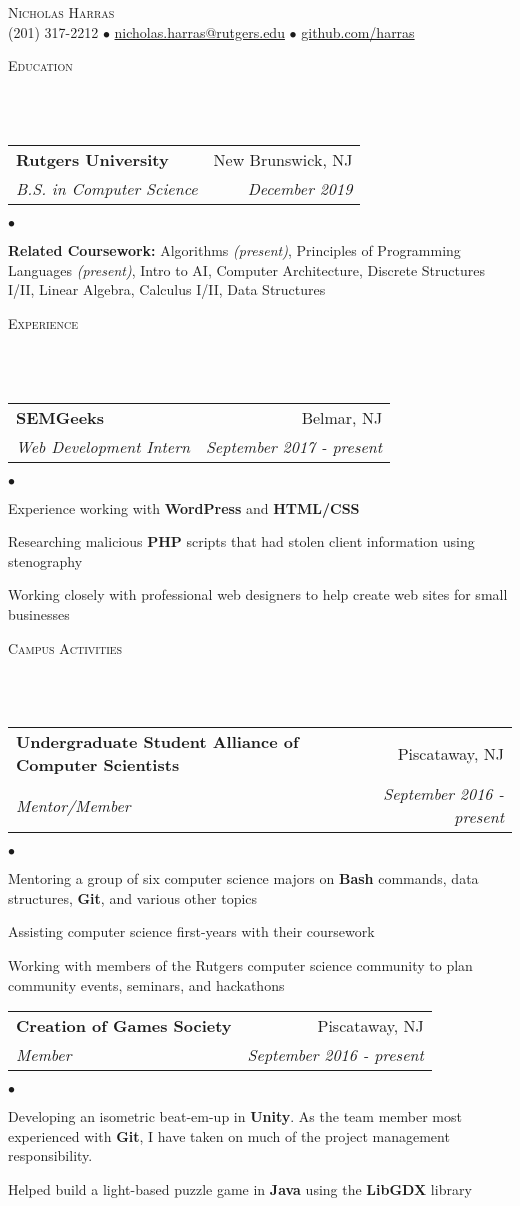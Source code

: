 \documentclass[12pt]{article}
\makeatletter
\newcommand{\lineunder}{
	\vspace*{-8pt} \\ 
	\hspace*{-18pt} 
	\hrulefill \\
}
\newcommand{\header}[1]{
	\vspace*{2pt}
	{\hspace*{-14pt}\vspace*{6pt} \textsc{#1}} 
	\vspace*{-6pt} 
	\lineunder
}
\newcommand{\contact}[2]{
	\vspace*{-8pt}
	\begin{center}
		{\LARGE \scshape {#1}}\\
		#2
	\end{center}
	\vspace*{-8pt}
}
\newenvironment{achievements}{
  \begin{list}{$\bullet$}{
  	\topsep 0pt \itemsep -4pt}}
  	{\vspace*{2pt}\end{list}
}
\newcommand{\mailto}[1]{
	\href{mailto:#1}{#1}}
\newcommand{\subheading}[4]{
 	\vspace{5pt}
    	\begin{tabular*}{1.01\textwidth}{l@{\extracolsep{\fill}}r}
      		\textbf{#1} & #2 \\
      		\textit{\small#3} & \textit{\small #4} \\
    	\end{tabular*}\vspace{-5pt}
}
\makeatother
\begin{document}
\small
\smallskip
\vspace*{-44pt}

\contact{Nicholas Harras}{(201) 317-2212 $\bullet$ \mailto{nicholas.harras@rutgers.edu} $\bullet$ \href{https://www.github.com/harras}{github.com/harras}}

\header{Education}

\subheading
	{Rutgers University}{New Brunswick, NJ}
	{B.S. in Computer Science}{December 2019}
	\begin{achievements}	
	\item{\bf Related Coursework:} Algorithms \textit{(present)}, Principles of Programming Languages \textit{(present)}, Intro to AI, Computer Architecture, Discrete Structures I/II, Linear Algebra, Calculus I/II, Data Structures
	\end{achievements}

\header{Experience}

\subheading
	{SEMGeeks}{Belmar, NJ}
	{Web Development Intern}{September 2017 - \textit{present}}
	\begin{achievements}
		\item Experience working with \textbf{WordPress} and \textbf{HTML/CSS}
		\item Researching malicious \textbf{PHP} scripts that had stolen client information using stenography
		\item Working closely with professional web designers to help create web sites for small businesses
	\end{achievements}

\header{Campus Activities}

\subheading
	{Undergraduate Student Alliance of Computer Scientists}{Piscataway, NJ}
	{Mentor/Member}{September 2016 - \textit{present}}
	\begin{achievements}
		\item Mentoring a group of six computer science majors on \textbf{Bash} commands, data structures, \textbf{Git}, and various other topics
		\item Assisting computer science first-years with their coursework
		\item Working with members of the Rutgers computer science community to plan community events, seminars, and hackathons
	\end{achievements}
	
\subheading
	{Creation of Games Society}{Piscataway, NJ}
	{Member}{September 2016 - \textit{present}}
	\begin{achievements}
		\item Developing an isometric beat-em-up in \textbf{Unity}. As the team member most experienced with \textbf{Git}, I have taken on much of the project management responsibility. 
		\item Helped build a light-based puzzle game in \textbf{Java} using the \textbf{LibGDX} library
	\end{achievements}
	
\end{document}
